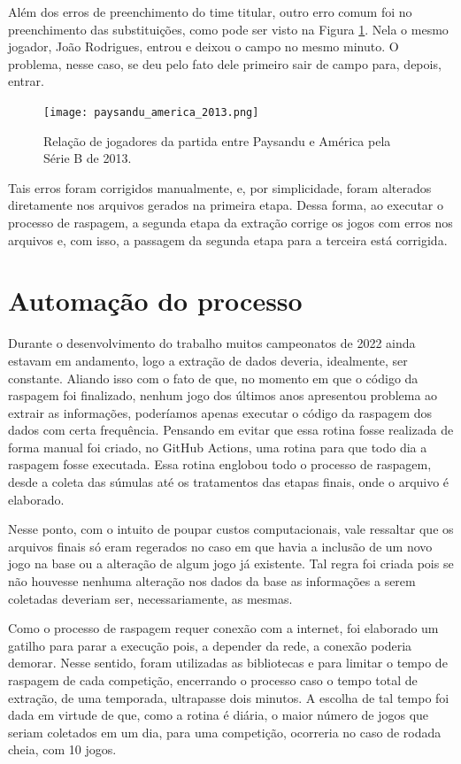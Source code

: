 Além dos erros de preenchimento do time titular, outro erro comum foi no preenchimento das substituições, como pode ser visto na Figura \ref{erro_ext3}. Nela o mesmo jogador, João Rodrigues, entrou e deixou o campo no mesmo minuto. O problema, nesse caso, se deu pelo fato dele primeiro sair de campo para, depois, entrar.
\begin{figure}[H]
    \centering
    \texttt{[image: paysandu\_america\_2013.png]}
    \caption{Relação de jogadores da partida entre Paysandu e América pela Série B de 2013.}
    \label{erro_ext3}
\end{figure}

Tais erros foram corrigidos manualmente, e, por simplicidade, foram alterados diretamente nos arquivos  gerados na primeira etapa. Dessa forma, ao executar o processo de raspagem, a segunda etapa da extração corrige os jogos com erros nos arquivos  e, com isso, a passagem da segunda etapa para a terceira está corrigida.

\section{Automação do processo}

Durante o desenvolvimento do trabalho muitos campeonatos de 2022 ainda estavam em andamento, logo a extração de dados deveria, idealmente, ser constante. Aliando isso com o fato de que, no momento em que o código da raspagem foi finalizado, nenhum jogo dos últimos anos apresentou problema ao extrair as informações, poderíamos apenas executar o código da raspagem dos dados com certa frequência. Pensando em evitar que essa rotina fosse realizada de forma manual foi criado, no GitHub Actions, uma rotina para que todo dia a raspagem fosse executada. Essa rotina englobou todo o processo de raspagem, desde a coleta das súmulas até os tratamentos das etapas finais, onde o arquivo  é elaborado.

Nesse ponto, com o intuito de poupar custos computacionais, vale ressaltar que os arquivos finais só eram regerados no caso em que havia a inclusão de um novo jogo na base ou a alteração de algum jogo já existente. Tal regra foi criada pois se não houvesse nenhuma alteração nos dados da base as informações a serem coletadas deveriam ser, necessariamente, as mesmas.

Como o processo de raspagem requer conexão com a internet, foi elaborado um gatilho para parar a execução pois, a depender da rede, a conexão poderia demorar. Nesse sentido, foram utilizadas as bibliotecas  e  para limitar o tempo de raspagem de cada competição, encerrando o processo caso o tempo total de extração, de uma temporada, ultrapasse dois minutos. A escolha de tal tempo foi dada em virtude de que, como a rotina é diária, o maior número de jogos que seriam coletados em um dia, para uma competição, ocorreria no caso de rodada cheia, com 10 jogos.

